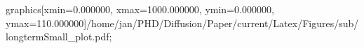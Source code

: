 graphics[xmin=0.000000, xmax=1000.000000, ymin=0.000000, ymax=110.000000]{/home/jan/PHD/Diffusion/Paper/current/Latex/Figures/sub/longtermSmall_plot.pdf}; 
